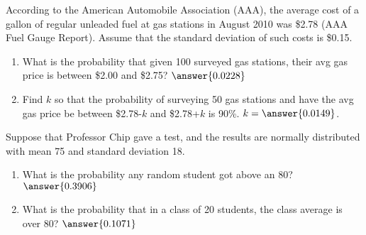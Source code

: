 \documentclass{ximera}
\begin{document}
\begin{problem}
According to the American Automobile Association (AAA), the average cost of a gallon of regular unleaded fuel at gas stations in August 2010 was \$2.78 (AAA Fuel Gauge Report). Assume that the standard deviation of such costs is \$0.15. 
\begin{enumerate}
\item What is the probability that given 100 surveyed gas stations, their avg gas price is between \$2.00 and \$2.75?  $\answer{0.0228}$
\item Find $k$ so that the probability of surveying 50 gas stations and have the avg gas price be between \$2.78-$k$ and \$2.78+$k$ is 90\%.  $k=\answer{0.0149}$.
\end{enumerate}

\end{problem}


\begin{problem}
Suppose that Professor Chip gave a test, and the results are normally distributed with mean 75 and standard deviation 18.

\begin{enumerate}
\item What is the probability any random student got above an 80? $\answer{0.3906}$
\item What is the probability that in a class of 20 students, the class average is over 80? $\answer{0.1071}$
\end{enumerate}




\end{problem}
\end{document}

